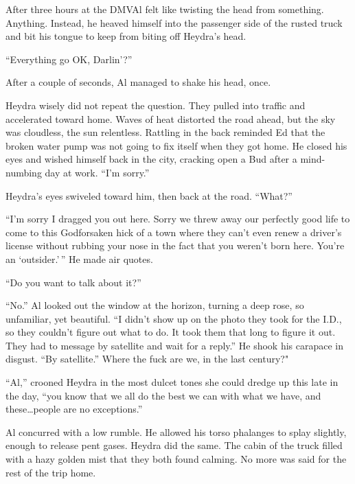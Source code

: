 
After three hours at the DMVAl felt like twisting the head from
something. Anything. Instead, he heaved himself into the passenger side
of the rusted truck and bit his tongue to keep from biting off Heydra's
head.

``Everything go OK, Darlin'?''

After a couple of seconds, Al managed to shake his head, once.

Heydra wisely did not repeat the question. They pulled into traffic and
accelerated toward home. Waves of heat distorted the road ahead, but the
sky was cloudless, the sun relentless. Rattling in the back reminded Ed
that the broken water pump was not going to fix itself when they got
home. He closed his eyes and wished himself back in the city, cracking
open a Bud after a mind-numbing day at work. ``I'm sorry.''

Heydra's eyes swiveled toward him, then back at the road. ``What?''

``I'm sorry I dragged you out here. Sorry we threw away our perfectly
good life to come to this Godforsaken hick of a town where they can't
even renew a driver's license without rubbing your nose in the fact that
you weren't born here. You're an `outsider.'\,'' He made air quotes.

``Do you want to talk about it?''

``No.'' Al looked out the window at the horizon, turning a deep rose, so
unfamiliar, yet beautiful. ``I didn't show up on the photo they took for
the I.D., so they couldn't figure out what to do. It took them that long
to figure it out. They had to message by satellite and wait for a
reply.'' He shook his carapace in disgust. ``By satellite.'' Where the
fuck are we, in the last century?"

``Al,'' crooned Heydra in the most dulcet tones she could dredge up this
late in the day, ``you know that we all do the best we can with what we
have, and these\ldots people are no exceptions.''

Al concurred with a low rumble. He allowed his torso phalanges to splay
slightly, enough to release pent gases. Heydra did the same. The cabin
of the truck filled with a hazy golden mist that they both found
calming. No more was said for the rest of the trip home.
